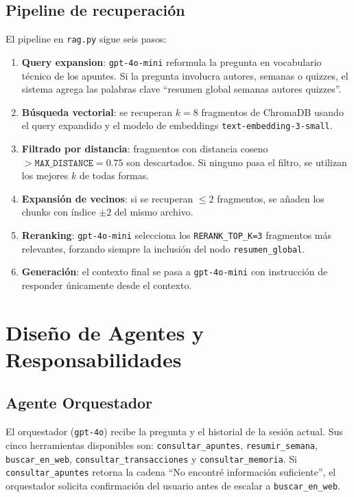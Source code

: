 \documentclass[conference]{IEEEtran}
\begin{document}
\subsection{Pipeline de recuperación}

El pipeline en \texttt{rag.py} sigue seis pasos:

\begin{enumerate}
    \item \textbf{Query expansion}: \texttt{gpt-4o-mini} reformula la pregunta en vocabulario técnico de los apuntes. Si la pregunta involucra autores, semanas o quizzes, el sistema agrega las palabras clave ``resumen global semanas autores quizzes''.
    \item \textbf{Búsqueda vectorial}: se recuperan $k=8$ fragmentos de ChromaDB usando el query expandido y el modelo de embeddings \texttt{text-embedding-3-small}.
    \item \textbf{Filtrado por distancia}: fragmentos con distancia coseno $> \texttt{MAX\_DISTANCE}=0.75$ son descartados. Si ninguno pasa el filtro, se utilizan los mejores $k$ de todas formas.
    \item \textbf{Expansión de vecinos}: si se recuperan $\leq 2$ fragmentos, se añaden los chunks con índice $\pm 2$ del mismo archivo.
    \item \textbf{Reranking}: \texttt{gpt-4o-mini} selecciona los \texttt{RERANK\_TOP\_K=3} fragmentos más relevantes, forzando siempre la inclusión del nodo \texttt{resumen\_global}.
    \item \textbf{Generación}: el contexto final se pasa a \texttt{gpt-4o-mini} con instrucción de responder únicamente desde el contexto.
\end{enumerate}

\section{Diseño de Agentes y Responsabilidades}

\subsection{Agente Orquestador}

El orquestador (\texttt{gpt-4o}) recibe la pregunta y el historial de la sesión actual. Sus cinco herramientas disponibles son: \texttt{consultar\_apuntes}, \texttt{resumir\_semana}, \texttt{buscar\_en\_web}, \texttt{consultar\_transacciones} y \texttt{consultar\_memoria}. Si \texttt{consultar\_apuntes} retorna la cadena ``No encontré información suficiente'', el orquestador solicita confirmación del usuario antes de escalar a \texttt{buscar\_en\_web}.
\end{document}
